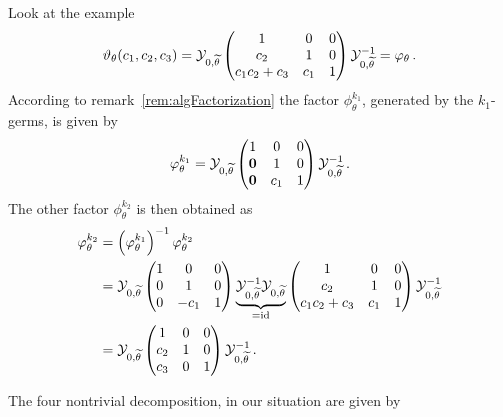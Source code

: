 \begin{exmp}\label{exmp:decompositionHere}
  Look at the example
  \[
    \vartheta_\theta(c_1,c_2,c_3)=
    \mathcal{Y}_{0,\widetilde\theta} 
    \begin{pmatrix} 1 & 0 & 0 \\c_2 & 1 & 0 \\c_1c_2+c_3 & c_1 & 1 \end{pmatrix}
    \mathcal{Y}_{0,\widetilde\theta}^{-1}
    =\varphi_\theta
    \,.
  \]
  According to remark~\ref{rem:algFactorization} the factor
  $\phi_\theta^{k_1}$, generated by the $k_1$-germs, is given by
  \[
    \varphi_\theta^{k_1}=
    \mathcal{Y}_{0,\widetilde\theta} 
    \begin{pmatrix}
      1 & 0 & 0
    \\\text{\boldmath $0$} & 1 & 0
    \\\text{\boldmath $0$} & c_1 & 1
    \end{pmatrix}
    \mathcal{Y}_{0,\widetilde\theta}^{-1}
    \,.
  \]
  The other factor $\phi_\theta^{k_2}$ is then obtained as
  \begin{align*}
    \phi_\theta^{k_2}&=
    \left(\phi_\theta^{k_1}\right)^{-1}
    \phi_\theta^{k_2}
  \\&=\cY_{0,\tilde\theta} 
    \begin{pmatrix}
      1     & 0    & 0
    \\0     & 1    & 0
    \\0     & -c_1 & 1
    \end{pmatrix}
    \underset{=\id}{\underbrace{%
        \cY_{0,\tilde\theta}^{-1}
        \cY_{0,\tilde\theta} 
    }}
    \begin{pmatrix} 1 & 0 & 0 \\c_2 & 1 & 0 \\c_1c_2+c_3 & c_1 & 1 \end{pmatrix}
    \cY_{0,\tilde\theta}^{-1}
  \\&=\cY_{0,\tilde\theta} 
    \begin{pmatrix}
      1     & 0 & 0
    \\c_2     & 1          & 0
    \\c_3     & 0          & 1
    \end{pmatrix}
    \cY_{0,\tilde\theta}^{-1}
    \,.
  \end{align*}
\end{exmp}
The four nontrivial decomposition, in our situation are given by
